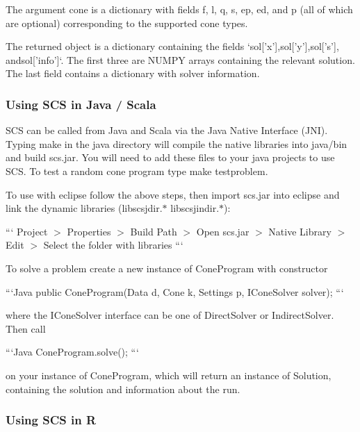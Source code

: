 The argument {\ttfamily cone} is a dictionary with fields {\ttfamily f}, {\ttfamily l}, {\ttfamily q}, {\ttfamily s}, {\ttfamily ep}, {\ttfamily ed}, and {\ttfamily p} (all of which are optional) corresponding to the supported cone types.

The returned object is a dictionary containing the fields `sol\mbox{[}'x'\mbox{]}{\ttfamily ,}sol\mbox{[}'y'\mbox{]}{\ttfamily ,}sol\mbox{[}'s'\mbox{]}{\ttfamily , and}sol\mbox{[}'info'\mbox{]}`. The first three are N\-U\-M\-P\-Y arrays containing the relevant solution. The last field contains a dictionary with solver information.

\subsubsection*{Using S\-C\-S in Java / Scala}

S\-C\-S can be called from Java and Scala via the Java Native Interface (J\-N\-I). Typing {\ttfamily make} in the {\ttfamily java} directory will compile the native libraries into {\ttfamily java/bin} and build {\ttfamily scs.\-jar}. You will need to add these files to your java projects to use S\-C\-S. To test a random cone program type {\ttfamily make testproblem}.

To use with eclipse follow the above steps, then import {\ttfamily scs.\-jar} into eclipse and link the dynamic libraries ({\ttfamily libscsjdir.$\ast$} {\ttfamily libscsjindir.$\ast$})\-:

``` Project $>$ Properties $>$ Build Path $>$ Open scs.\-jar $>$ Native Library $>$ Edit $>$ Select the folder with libraries ```

To solve a problem create a new instance of {\ttfamily Cone\-Program} with constructor

```\-Java public Cone\-Program(\-Data d, Cone k, Settings p, I\-Cone\-Solver solver); ```

where the {\ttfamily I\-Cone\-Solver} interface can be one of {\ttfamily Direct\-Solver} or {\ttfamily Indirect\-Solver}. Then call

```\-Java Cone\-Program.\-solve(); ```

on your instance of {\ttfamily Cone\-Program}, which will return an instance of {\ttfamily Solution}, containing the solution and information about the run.

\subsubsection*{Using S\-C\-S in R}

